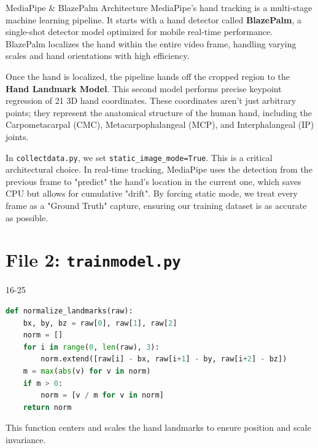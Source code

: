 \documentclass[a4paper,11pt]{article}
\begin{document}
\begin{deepdivebox}{MediaPipe \& BlazePalm Architecture}
MediaPipe's hand tracking is a multi-stage machine learning pipeline. It starts with a hand detector called \textbf{BlazePalm}, a single-shot detector model optimized for mobile real-time performance. BlazePalm localizes the hand within the entire video frame, handling varying scales and hand orientations with high efficiency.

Once the hand is localized, the pipeline hands off the cropped region to the \textbf{Hand Landmark Model}. This second model performs precise keypoint regression of 21 3D hand coordinates. These coordinates aren't just arbitrary points; they represent the anatomical structure of the human hand, including the Carpometacarpal (CMC), Metacarpophalangeal (MCP), and Interphalangeal (IP) joints.

In \texttt{collectdata.py}, we set \texttt{static\_image\_mode=True}. This is a critical architectural choice. In real-time tracking, MediaPipe uses the detection from the previous frame to "predict" the hand's location in the current one, which saves CPU but allows for cumulative "drift". By forcing static mode, we treat every frame as a "Ground Truth" capture, ensuring our training dataset is as accurate as possible.
\end{deepdivebox}

\newpage
\section{File 2: \texttt{trainmodel.py}}
\begin{linebox}{16-25}{}
\begin{lstlisting}[language=Python, firstnumber=16]
def normalize_landmarks(raw):
    bx, by, bz = raw[0], raw[1], raw[2]
    norm = []
    for i in range(0, len(raw), 3):
        norm.extend([raw[i] - bx, raw[i+1] - by, raw[i+2] - bz])
    m = max(abs(v) for v in norm)
    if m > 0:
        norm = [v / m for v in norm]
    return norm
\end{lstlisting}
This function centers and scales the hand landmarks to ensure position and scale invariance.
\end{linebox}
\end{document}
